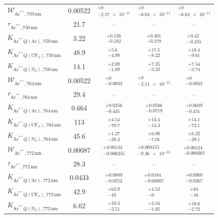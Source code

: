 \begin{longtable}{lcccc}
\midrule
$\mathcal{W}_{\mathrm{Ar}^{**},750\,\mathrm{nm}}$ & \num{0.00522} & $^{+\num{0}}_{-\num{2.17e-17}}$ & $^{+\num{0}}_{-\num{6.04e-14}}$ & $^{+\num{0}}_{-\num{6.04e-14}}$ \\
$\tau_{\mathrm{Ar}^{**},750\,\mathrm{nm}}$ & \num{21.7} & -- & -- & -- \\
$K_{\mathrm{Ar}^{**}Q(\mathrm{Ar}),750\,\mathrm{nm}}$ & \num{3.22} & $^{+\num{0.126}}_{-\num{0.182}}$ & $^{+\num{0.401}}_{-\num{0.179}}$ & $^{+\num{0.42}}_{-\num{0.255}}$ \\
$K_{\mathrm{Ar}^{**}Q(\mathrm{CF}_4),750\,\mathrm{nm}}$ & \num{48.9} & $^{+\num{5.6}}_{-\num{4.98}}$ & $^{+\num{17.5}}_{-\num{8.22}}$ & $^{+\num{18.4}}_{-\num{9.61}}$ \\
$K_{\mathrm{Ar}^{**}Q(\mathrm{N}_2),750\,\mathrm{nm}}$ & \num{14.1} & $^{+\num{2.09}}_{-\num{1.89}}$ & $^{+\num{7.25}}_{-\num{3.23}}$ & $^{+\num{7.54}}_{-\num{3.74}}$ \\
\midrule
$\mathcal{W}_{\mathrm{Ar}^{**},764\,\mathrm{nm}}$ & \num{0.00522} & $^{+\num{0}}_{-\num{0.0033}}$ & $^{+\num{0}}_{-\num{2.11e-13}}$ & $^{+\num{0}}_{-\num{0.0033}}$ \\
$\tau_{\mathrm{Ar}^{**},764\,\mathrm{nm}}$ & \num{29.4} & -- & -- & -- \\
$K_{\mathrm{Ar}^{**}Q(\mathrm{Ar}),764\,\mathrm{nm}}$ & \num{0.664} & $^{+\num{0.0256}}_{-\num{0.445}}$ & $^{+\num{0.0586}}_{-\num{0.0719}}$ & $^{+\num{0.0639}}_{-\num{0.451}}$ \\
$K_{\mathrm{Ar}^{**}Q(\mathrm{CF}_4),764\,\mathrm{nm}}$ & \num{113} & $^{+\num{4.54}}_{-\num{70.7}}$ & $^{+\num{13.4}}_{-\num{14.3}}$ & $^{+\num{14.1}}_{-\num{72.1}}$ \\
$K_{\mathrm{Ar}^{**}Q(\mathrm{N}_2),764\,\mathrm{nm}}$ & \num{45.6} & $^{+\num{1.27}}_{-\num{28.3}}$ & $^{+\num{6.09}}_{-\num{7.01}}$ & $^{+\num{6.22}}_{-\num{29.1}}$ \\
\midrule
$\mathcal{W}_{\mathrm{Ar}^{**},772\,\mathrm{nm}}$ & \num{0.00087} & $^{+\num{0.00134}}_{-\num{0.000355}}$ & $^{+\num{0.000155}}_{-\num{9.36e-05}}$ & $^{+\num{0.00134}}_{-\num{0.000367}}$ \\
$\tau_{\mathrm{Ar}^{**},772\,\mathrm{nm}}$ & \num{28.3} & -- & -- & -- \\
$K_{\mathrm{Ar}^{**}Q(\mathrm{Ar}),772\,\mathrm{nm}}$ & \num{0.0433} & $^{+\num{0.0889}}_{-\num{0.0252}}$ & $^{+\num{0.0184}}_{-\num{0.00867}}$ & $^{+\num{0.0908}}_{-\num{0.0267}}$ \\
$K_{\mathrm{Ar}^{**}Q(\mathrm{CF}_4),772\,\mathrm{nm}}$ & \num{42.9} & $^{+\num{63.9}}_{-\num{16}}$ & $^{+\num{4.53}}_{-\num{0}}$ & $^{+\num{64}}_{-\num{16}}$ \\
$K_{\mathrm{Ar}^{**}Q(\mathrm{N}_2),772\,\mathrm{nm}}$ & \num{6.62} & $^{+\num{10.3}}_{-\num{2.51}}$ & $^{+\num{2.34}}_{-\num{1.05}}$ & $^{+\num{10.6}}_{-\num{2.72}}$ \\
\bottomrule
\end{longtable}
